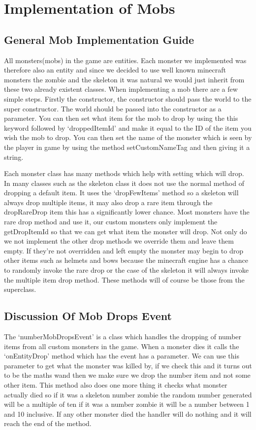 \section{Implementation of Mobs}
\subsection{General Mob Implementation Guide}
All monsters(mobs) in the game are entities. Each monster we implemented was therefore also an entity and since we decided to use well known minecraft monsters the zombie and the skeleton it was natural we would just inherit from these two already existent classes. When implementing a mob there are a few simple steps. Firstly the constructor, the constructor should pass the world to the super constructor. The world should be passed into the constructor as a parameter. You can then set what item for the mob to drop by using the this keyword followed by ‘droppedItemId’ and make it equal to the ID of the item you wish the mob to drop. You can then set the name of the monster which is seen by the player in game by using the method setCustomNameTag and then giving it a string.

Each monster class has many methods which help with setting which will drop. In many classes such as the skeleton class it does not use the normal method of dropping a default item. It uses the ‘dropFewItems’ method so a skeleton will always drop multiple items, it may also drop a rare item through the dropRareDrop item this has a significantly lower chance. Most monsters have the rare drop method and use it, our custom monsters only implement the getDropItemId so that we can get what item the monster will drop. Not only do we not implement the other drop methods we override them and leave them empty. If they’re not overridden and left empty the monster may begin to drop other items such as helmets and bows because the minecraft engine has a chance to randomly invoke the rare drop or the case of the skeleton it will always invoke the multiple item drop method. These methods will of course be those from the superclass.

\subsection{Discussion Of Mob Drops Event}
The ‘numberMobDropsEvent’ is a class which handles the dropping of number items from all custom monsters in the game. When a monster dies it calls the ‘onEntityDrop’ method which has the event has a parameter. We can use this parameter to get what the monster was killed by, if we check this and it turns out to be the maths wand then we make sure we drop the number item and not some other item. This method also does one more thing it checks what monster actually died so if it was a skeleton number zombie the random number generated will be a multiple of ten if it was a number zombie it will be a number between 1 and 10 inclusive. If any other monster died the handler will do nothing and it will reach the end of the method.

